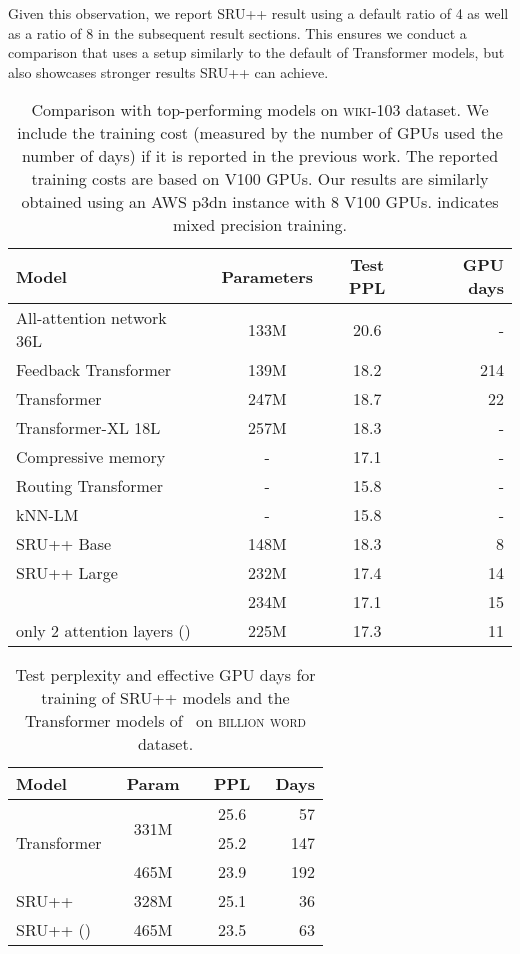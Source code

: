 Given this observation, we report SRU++ result using a default ratio of 4 as well as a ratio of 8 in the subsequent result sections.
This ensures we conduct a comparison that uses a setup similarly to the default of Transformer models, but also showcases stronger results SRU++ can achieve.


\begin{table*}[!t!]
    \centering
    \begin{tabular}{lccr}
    \toprule
    \bf Model & \bf Parameters  & \bf Test PPL  & \bf GPU days \\
    \hline
    All-attention network 36L~\cite{sukhbaatar2019augmenting} & 133M & 20.6 & -\\
    Feedback Transformer~\cite{fan2020accessing} & 139M & 18.2 & 214\\
    Transformer~\cite{baevski2018adaptive} & 247M & 18.7 & 22\\
    Transformer-XL 18L~\cite{dai-etal-2019-transformer} & 257M & 18.3 & - \\
      Compressive memory~\cite{Rae2020Compressive} & - & 17.1 & -\\
    Routing Transformer~\cite{roy2020efficient} & - & 15.8 & -\\
    kNN-LM~\cite{Khandelwal2020Generalization} & - & 15.8 & -\\
    \hline
    SRU++ Base & 148M & 18.3 & 8 \\
\hdashline
    SRU++ Large & 232M & 17.4 & 14 \\
       & 234M & 17.1 & 15\\   
      only 2 attention layers () & 225M & 17.3 & 11\\   
\bottomrule
    \end{tabular}
    \caption{Comparison with top-performing models on \textsc{wiki-103} dataset. We include the training cost (measured by the number of GPUs used  the number of days) if it is reported in the previous work. The reported training costs are based on V100 GPUs. Our results are similarly obtained using an AWS p3dn instance with 8 V100 GPUs.  indicates mixed precision training.}
    \label{tab:wit103_sota}
\end{table*}
\begin{table}[!t]
    \centering
    \begin{tabular}{lccr}
    \toprule
    \bf Model & \bf ~Param~ & \bf ~PPL~ & \bf Days\\
    \hline
    \multirow{3}{*}{Transformer} & \multirow{2}{*}{331M} & 25.6 & 57\\
    & & 25.2 & 147\\
    & 465M & 23.9 & 192 \\
    \hline
    SRU++ & 328M & 25.1 & 36\\
    SRU++ () & 465M & 23.5 & 63\\
\bottomrule
    \end{tabular}
    \caption{Test perplexity and effective GPU days for training of SRU++ models and the Transformer models of~\citet{baevski2018adaptive} on \textsc{billion word} dataset.}
    \label{tab:1blm}
\end{table}

